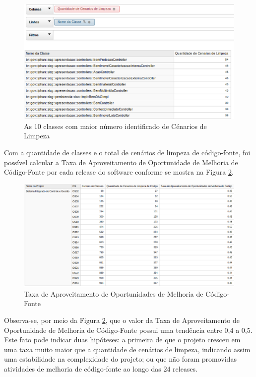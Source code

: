 \begin{figure}[ht!]
\centering
\includegraphics[keepaspectratio=true,scale=0.55]{figuras/10-best.eps}
\caption{As 10 classes com maior número identificado de Cénarios de Limpeza}
\label{fig:worst-10-cenarios}
\end{figure}
\FloatBarrier

Com a quantidade de classes e o total de cenários de limpeza de código-fonte, foi possível calcular a Taxa de Aproveitamento de Oportunidade de Melhoria de Código-Fonte por cada release do software conforme se mostra na Figura \ref{fig:taxa-cenarios}.

\begin{figure}[H]
\centering
\includegraphics[keepaspectratio=true,scale=0.38]{figuras/taxa-parcial.eps}
\caption{Taxa de Aproveitamento de Oportunidades de Melhoria de Código-Fonte}
\label{fig:taxa-cenarios}
\end{figure}
\FloatBarrier

Observa-se, por meio da Figura \ref{fig:taxa-cenarios}, que o valor da Taxa de Aproveitamento de Oportunidade de Melhoria de Código-Fonte possui uma tendência entre 0,4 a 0,5. Este fato pode indicar duas hipóteses: a primeira de que o projeto cresceu em uma taxa muito maior que a quantidade de cenários de limpeza, indicando assim uma estabilidade na complexidade do projeto; ou que não foram promovidas atividades de melhoria de código-fonte ao longo das 24 releases.
